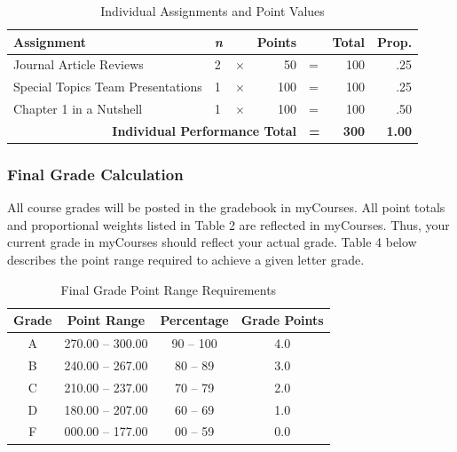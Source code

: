 \documentclass[
]{article}
\begin{document}
\begin{table}[H]
\centering
\caption{Individual Assignments and Point Values}
\vspace{3mm}
\label{points}
\begin{tabular}{lllrlrr}
\hline
\bf{Assignment} & \bf{\em{n}} &  & \bf{Points} &  & \bf{Total} & \bf{Prop.} \\
\hline
Journal Article Reviews & 2 & $\times$ & 50 & = & 100 & .25\\
Special Topics Team Presentations & 1 & $\times$ & 100 & = & 100 & .25\\
Chapter 1 in a Nutshell & 1 & $\times$ & 100 & = & 100 & .50 \\
\multicolumn{4}{r}{\bf{Individual Performance Total}} & {\bf{=}} & {\bf{300}} & {\bf{1.00}} \\
\hline
\end{tabular}
\label{points}
\end{table}

\subsubsection{Final Grade Calculation}

All course grades will be posted in the gradebook in myCourses. All
point totals and proportional weights listed in Table 2 are reflected in
myCourses. Thus, your current grade in myCourses should reflect your
actual grade. Table 4 below describes the point range required to
achieve a given letter grade.

\begin{table}[H]
\begin{center}
\caption{Final Grade Point Range Requirements}
\label{finalgrades}
\vspace{3mm}
\begin{tabular}{cccc}
\hline
\bf{Grade} & \bf{Point Range} & \bf{Percentage} & \bf{Grade Points}\\
\hline
A & 270.00 -- 300.00 & 90 -- 100 & 4.0\\ 
B & 240.00 -- 267.00 & 80 -- 89  & 3.0\\ 
C & 210.00 -- 237.00 & 70 -- 79  & 2.0\\ 
D & 180.00 -- 207.00 & 60 -- 69  & 1.0\\ 
F & 000.00 -- 177.00 & 00 -- 59  & 0.0\\
\hline
\end{tabular}
\end{center}
\end{table}
\end{document}
